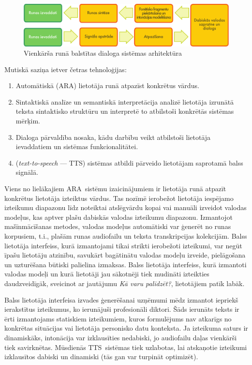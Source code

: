 \begin{multicols}{2}
\begin{figure}[htb]
  \center 
  \includegraphics[width=\textwidth]{../_media/latvian/simple_speech-based_dialogue_architecture}
  \caption{Vienkārša runā balstītas dialoga sistēmas arhitektūra}
  \label{fig:dialoguearch_de}
\end{figure}
Mutiskā saziņa ietver četras tehnoloģijas: 

\begin{enumerate}
\item  Automātiskā  (ARA) lietotāja runā atpazīst konkrētus vārdus.
\item  Sintaktiskā analīze un semantiskā interpretācija analizē lietotāja izrunātā teksta sintaktisko struktūru un interpretē to atbilstoši konkrētās sistēmas mērķim.
\item  Dialoga pārvaldība nosaka, kādu darbību veikt atbilstoši lietotāja ievaddatiem un sistēmas funkcionalitātei.
\item  {} (\textit{text-to-speech} — TTS) sistēmas atbildi pārveido lietotājam saprotamā balss signālā. 
\end{enumerate}

Viens no lielākajiem ARA~sistēmu izaicinājumiem ir lietotāja runā atpazīt konkrētus lietotāja izteiktus vārdus.
Tas nozīmē ierobežot lietotāja iespējamo izteikumu diapazonu līdz noteiktai atslēgvārdu kopai vai manuāli izveidot valodas modeļus, kas aptver plašu dabiskās valodas izteikumu diapazonu.
Izmantojot mašīnmācīšanas metodes, valodas modeļus automātiski var ģenerēt no runas korpusiem, t.i., plašām runas audiofailu un teksta transkripcijas kolekcijām.
Balss lietotāja interfeiss, kurā izmantojami tikai strikti ierobežoti izteikumi, var negūt īpašu lietotāju atzinību, savukārt bagātinātu valodas modeļu izveide, pielāgošana un uzturēšana būtiski palielina izmaksas.
Balss lietotāja interfeiss, kurā izmantoti valodas modeļi un kurā lietotāji jau sākotnēji tiek mudināti izteikties daudzveidīgāk, sveicinot ar jautājumu \textit{Kā varu palīdzēt?}, lietotājiem patīk labāk. 

Balss lietotāja interfeisa izvades ģenerēšanai uzņēmumi mēdz izmantot iepriekš ierakstītus izteikumus, ko ierunājuši profesionāli diktori.
Šāds ierunāts teksts ir ērti izmantojams statiskiem izteikumiem, kuros formulējums nav atkarīgs no konkrētas situācijas vai lietotāja personisko datu konteksta.
Ja izteikuma saturs ir dinamiskāks, intonācija var izklausīties nedabiski, jo audiofailu daļas vienkārši tiek savirknētas.
Mūsdienās TTS~sistēmas tiek uzlabotas, lai atskaņotie izteikumi izklausītos dabiski un dinamiski (tās gan var turpināt optimizēt).


\end{multicols}
